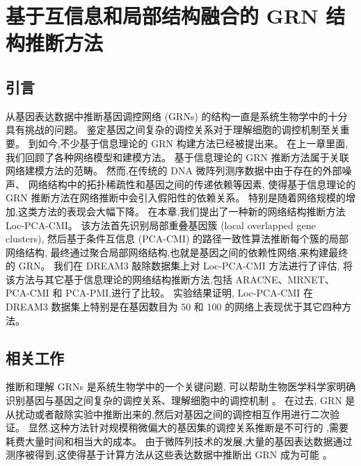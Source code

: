 \section{基于互信息和局部结构融合的 GRN 结构推断方法}
\label{sec:locpcacmi}

\subsection{引言}

从基因表达数据中推断基因调控网络 (GRNs) 的结构一直是系统生物学中的十分具有挑战的问题。
鉴定基因之间复杂的调控关系对于理解细胞的调控机制至关重要。
到如今,不少基于信息理论的 GRN 构建方法已经被提出来。
在上一章里面, 我们回顾了各种网络模型和建模方法。
基于信息理论的 GRN 推断方法属于关联网络建模方法的范畴。
然而,在传统的 DNA 微阵列测序数据中由于存在的外部噪声、
网络结构中的拓扑稀疏性和基因之间的传递依赖等因素,
使得基于信息理论的 GRN 推断方法在网络推断中会引入假阳性的依赖关系。
特别是随着网络规模的增加,这类方法的表现会大幅下降。
在本章,我们提出了一种新的网络结构推断方法 Loc-PCA-CMI。
该方法首先识别局部重叠基因簇 (local overlapped gene clusters),
然后基于条件互信息 (PCA-CMI) 的路径一致性算法推断每个簇的局部网络结构,
最终通过聚合局部网络结构,也就是基因之间的依赖性网络,来构建最终的 GRN。
我们在 DREAM3 敲除数据集上对 Loc-PCA-CMI 方法进行了评估,
将该方法与其它基于信息理论的网络结构推断方法,包括 ARACNE、MRNET、PCA-CMI 和 PCA-PMI,进行了比较。
实验结果证明, Loc-PCA-CMI 在 DREAM3 数据集上特别是在基因数目为 50 和 100 的网络上表现优于其它四种方法。

\subsection{相关工作}
\label{subsec:relatedwork}

推断和理解 GRNs 是系统生物学中的一个关键问题, 
可以帮助生物医学科学家明确识别基因与基因之间复杂的调控关系、理解细胞中的调控机制 \cite{altay2010inferring, basso2005reverse}。
在过去, GRN 是从扰动或者敲除实验中推断出来的,然后对基因之间的调控相互作用进行二次验证。
显然,这种方法针对规模稍微偏大的基因集的调控关系推断是不可行的 \cite{elnitski2006locating},需要耗费大量时间和相当大的成本。
由于微阵列技术的发展,大量的基因表达数据通过测序被得到,这使得基于计算方法从这些表达数据中推断出 GRN 成为可能 \cite{maetschke2013supervised}。

